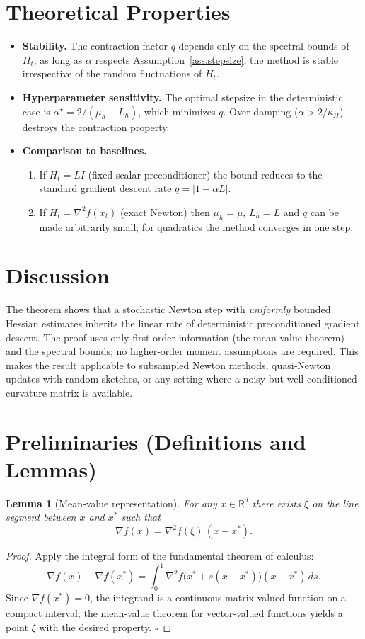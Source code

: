 \documentclass{article}
\newtheorem{lemma}{Lemma}
\newcommand{\R}{\mathbb{R}}
\begin{document}
\section*{Theoretical Properties}
\begin{itemize}
\item \textbf{Stability.} The contraction factor $q$ depends only on the spectral bounds of $H_{t}$; as long as $\alpha$ respects Assumption~\ref{ass:stepsize}, the method is stable irrespective of the random fluctuations of $H_{t}$.
\item \textbf{Hyperparameter sensitivity.} The optimal stepsize in the deterministic case is $\alpha^{\star}=2/(\mu_{h}+L_{h})$, which minimizes $q$. Over‑damping ($\alpha>2/\kappa_{H}$) destroys the contraction property.
\item \textbf{Comparison to baselines.}
    \begin{enumerate}
        \item If $H_{t}=L I$ (fixed scalar preconditioner) the bound reduces to the standard gradient descent rate $q=|1-\alpha L|$.
        \item If $H_{t}=\nabla^{2}f(x_{t})$ (exact Newton) then $\mu_{h}=\mu$, $L_{h}=L$ and $q$ can be made arbitrarily small; for quadratics the method converges in one step.
    \end{enumerate}
\end{itemize}

\section*{Discussion}
The theorem shows that a stochastic Newton step with \emph{uniformly} bounded Hessian estimates inherits the linear rate of deterministic preconditioned gradient descent. The proof uses only first‑order information (the mean‑value theorem) and the spectral bounds; no higher‑order moment assumptions are required. This makes the result applicable to subsampled Newton methods, quasi‑Newton updates with random sketches, or any setting where a noisy but well‑conditioned curvature matrix is available.

\newpage
\section*{Preliminaries (Definitions and Lemmas)}
\begin{lemma}[Mean‑value representation]\label{lem:mvt}
For any $x\in\R^{d}$ there exists $\xi$ on the line segment between $x$ and $x^{*}$ such that
\[
\nabla f(x)=\nabla^{2}f(\xi)\,(x-x^{*}) .
\]
\end{lemma}
\begin{proof}
Apply the integral form of the fundamental theorem of calculus:
\[
\nabla f(x)-\nabla f(x^{*})=\int_{0}^{1}\nabla^{2}f\bigl(x^{*}+s(x-x^{*})\bigr)(x-x^{*})\,ds.
\]
Since $\nabla f(x^{*})=0$, the integrand is a continuous matrix‐valued function on a compact interval; the mean‑value theorem for vector‑valued functions yields a point $\xi$ with the desired property. \hfill $\square$
\end{proof}
\end{document}
